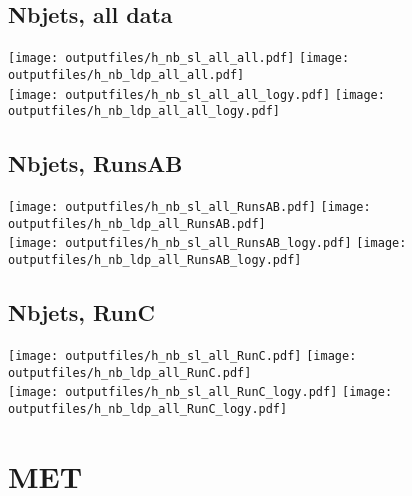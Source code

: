 \documentclass[11pt]{article}
\begin{document}
    \subsection{ Nbjets, all data}

    \noindent
     \texttt{[image: outputfiles/h\_nb\_sl\_all\_all.pdf]}
     \texttt{[image: outputfiles/h\_nb\_ldp\_all\_all.pdf]} \\
     \texttt{[image: outputfiles/h\_nb\_sl\_all\_all\_logy.pdf]}
     \texttt{[image: outputfiles/h\_nb\_ldp\_all\_all\_logy.pdf]}


    \subsection{ Nbjets, RunsAB}

    \noindent
     \texttt{[image: outputfiles/h\_nb\_sl\_all\_RunsAB.pdf]}
     \texttt{[image: outputfiles/h\_nb\_ldp\_all\_RunsAB.pdf]} \\
     \texttt{[image: outputfiles/h\_nb\_sl\_all\_RunsAB\_logy.pdf]}
     \texttt{[image: outputfiles/h\_nb\_ldp\_all\_RunsAB\_logy.pdf]}


    \subsection{ Nbjets, RunC}

    \noindent
     \texttt{[image: outputfiles/h\_nb\_sl\_all\_RunC.pdf]}
     \texttt{[image: outputfiles/h\_nb\_ldp\_all\_RunC.pdf]} \\
     \texttt{[image: outputfiles/h\_nb\_sl\_all\_RunC\_logy.pdf]}
     \texttt{[image: outputfiles/h\_nb\_ldp\_all\_RunC\_logy.pdf]}













    \section{MET}
\end{document}
